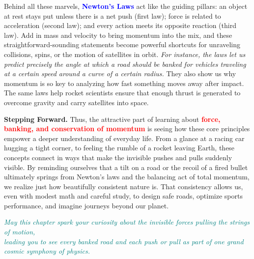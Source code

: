 \documentclass[12pt]{article}
\begin{document}
\vspace{0.5em}
\noindent
Behind all these marvels, \textcolor{blue}{\textbf{Newton’s Laws}} act like the guiding pillars: an object at rest stays put unless there is a net push (first law); force is related to acceleration (second law); and every action meets its opposite reaction (third law). Add in mass and velocity to bring momentum into the mix, and these straightforward-sounding statements become powerful shortcuts for unraveling collisions, spins, or the motion of satellites in orbit. \emph{For instance, the laws let us predict precisely the angle at which a road should be banked for vehicles traveling at a certain speed around a curve of a certain radius.} They also show us why momentum is so key to analyzing how fast something moves away after impact. The same laws help rocket scientists ensure that enough thrust is generated to overcome gravity and carry satellites into space. 

\vspace{0.5em}
\noindent
\textbf{Stepping Forward.} Thus, the attractive part of learning about \textcolor{red}{\textbf{force, banking, and conservation of momentum}} is seeing how these core principles empower a deeper understanding of everyday life. From a glance at a racing car hugging a tight corner, to feeling the rumble of a rocket leaving Earth, these concepts connect in ways that make the invisible pushes and pulls suddenly visible. By reminding ourselves that a tilt on a road or the recoil of a fired bullet ultimately springs from Newton’s laws and the balancing act of total momentum, we realize just how beautifully consistent nature is. That consistency allows us, even with modest math and careful study, to design safe roads, optimize sports performance, and imagine journeys beyond our planet. 

\vspace{1em}
\begin{center}
\textit{\textcolor{teal}{May this chapter spark your curiosity about the invisible forces pulling the strings of motion,}} \\
\textit{\textcolor{teal}{leading you to see every banked road and each push or pull as part of one grand cosmic symphony of physics.}} 
\end{center}
\end{document}
